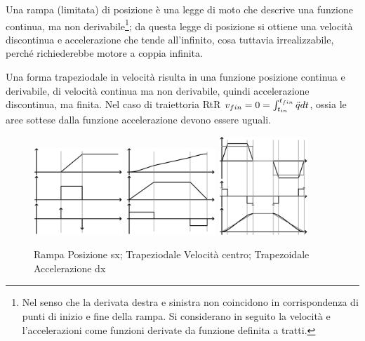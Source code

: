 Una rampa (limitata) di posizione è una legge di moto che descrive una funzione continua, ma non derivabile\footnote{Nel senso che la derivata destra e sinistra non coincidono in corrispondenza di punti di inizio e fine della rampa. Si considerano in seguito la velocità e l'accelerazioni come funzioni derivate da funzione definita a tratti.}; da questa legge di posizione si ottiene una velocità discontinua e accelerazione che tende all'infinito, cosa tuttavia irrealizzabile, perché richiederebbe motore a coppia infinita.

Una forma trapeziodale in velocità risulta in una funzione posizione continua e derivabile, di velocità continua ma non derivabile, quindi accelerazione discontinua, ma finita.
Nel caso di traiettoria RtR \( v_{fin} = 0 = \int^{t_{fin}}_{t_{in}} \Ddot{q} dt \), ossia le aree sottese dalla funzione accelerazione devono essere uguali.

\begin{figure}[h]
    \centering
    \includegraphics[width=0.3\textwidth]{Immagini/rampa_pos.png}
    \includegraphics[width=0.3\textwidth]{Immagini/trapezoidale_vel.png}
    \includegraphics[width=0.3\textwidth]{Immagini/trapezoidale_acc.png}
    \caption{Rampa Posizione sx; Trapeziodale Velocità centro; Trapezoidale Accelerazione dx}
\end{figure}

